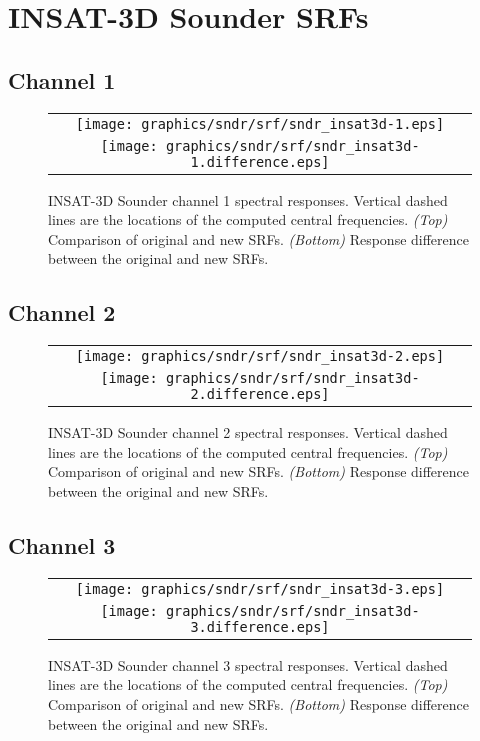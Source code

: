 \section{INSAT-3D Sounder SRFs}
\label{app.sndr_srf_data_plots}

\subsection{Channel 1}
\begin{figure}[H]
  \label{fig:sndr_ch1}
  \centering
  \begin{tabular}{c}
    \texttt{[image: graphics/sndr/srf/sndr\_insat3d-1.eps]} \\
    \texttt{[image: graphics/sndr/srf/sndr\_insat3d-1.difference.eps]}
  \end{tabular}
  \caption{INSAT-3D Sounder channel 1 spectral responses. Vertical dashed lines are the locations of the computed central frequencies. \emph{(Top)} Comparison of original and new SRFs. \emph{(Bottom)} Response difference between the original and new SRFs.}
\end{figure}

\subsection{Channel 2}
\begin{figure}[H]
  \label{fig:sndr_ch2}
  \centering
  \begin{tabular}{c}
    \texttt{[image: graphics/sndr/srf/sndr\_insat3d-2.eps]} \\
    \texttt{[image: graphics/sndr/srf/sndr\_insat3d-2.difference.eps]}
  \end{tabular}
  \caption{INSAT-3D Sounder channel 2 spectral responses. Vertical dashed lines are the locations of the computed central frequencies. \emph{(Top)} Comparison of original and new SRFs. \emph{(Bottom)} Response difference between the original and new SRFs.}
\end{figure}

\subsection{Channel 3}
\begin{figure}[H]
  \label{fig:sndr_ch3}
  \centering
  \begin{tabular}{c}
    \texttt{[image: graphics/sndr/srf/sndr\_insat3d-3.eps]} \\
    \texttt{[image: graphics/sndr/srf/sndr\_insat3d-3.difference.eps]}
  \end{tabular}
  \caption{INSAT-3D Sounder channel 3 spectral responses. Vertical dashed lines are the locations of the computed central frequencies. \emph{(Top)} Comparison of original and new SRFs. \emph{(Bottom)} Response difference between the original and new SRFs.}
\end{figure}

